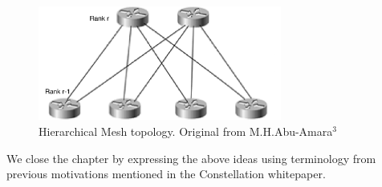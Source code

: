 \documentclass{article}
\begin{document}
\begin{figure}[h]
\centering
\includegraphics[width=8cm]{Designing_a_network_topology-M_H_Abu-Amara}
\caption{Hierarchical Mesh topology. Original from M.H.Abu-Amara$^3$} %
\end{figure}

We close the chapter by expressing the above ideas using terminology from previous motivations mentioned in the Constellation whitepaper. 
\end{document}
